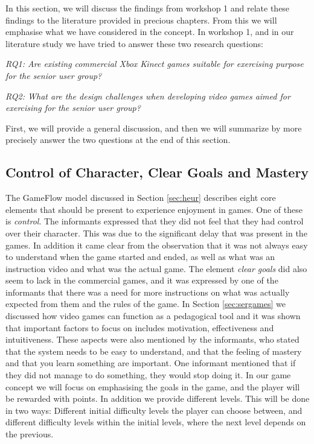 In this section, we will discuss the findings from workshop 1 and relate these findings to the literature provided in precious chapters. From this we will emphasise what we have considered in the concept. In workshop 1, and in our literature study we have tried to answer these two research questions: 

\emph{RQ1: Are existing commercial Xbox Kinect games suitable for exercising purpose for the senior user group?}

\emph{RQ2: What are the design challenges when developing video games aimed for exercising for the senior user group?}

First, we will provide a general discussion, and then we will summarize by more precisely answer the two questions at the end of this section. 

\subsection{Control of Character, Clear Goals and Mastery}
The GameFlow model \cite{sweetser} discussed in Section \ref{sec:heur} describes eight core elements that should be present to experience enjoyment in games. One of these is \emph{control}. The informants expressed that they did not feel that they had control over their character. This was due to the significant delay that was present in the games. In addition it came clear from the observation that it was not always easy to understand when the game started and ended, as well as what was an instruction video and what was the actual game. The element \emph{clear goals} did also seem to lack in the commercial games, and it was expressed by one of the informants that there was a need for more instructions on what was actually expected from them and the rules of the game. In Section \ref{sec:sergames} we discussed how video games can function as a pedagogical tool and it was shown that important factors to focus on includes motivation, effectiveness and intuitiveness.  These aspects were also mentioned by the informants, who stated that the system needs to be easy to understand, and that the feeling of mastery and that you learn something are important.  One informant mentioned that if they did not manage to do something, they would stop doing it. In our game concept we will focus on emphasising the goals in the game, and the player will be rewarded with points. In addition we provide different levels. This will be done in two ways: Different initial difficulty levels the player can choose between, and different difficulty levels within the initial levels, where the next level depends on the previous.  

